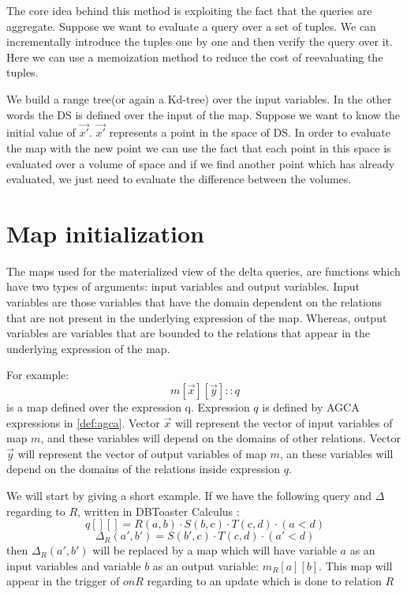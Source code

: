 \documentclass[12pt]{article}
\begin{document}
The core idea behind this method is exploiting the fact that the queries are aggregate. Suppose we want to evaluate a query over a set of tuples. We can incrementally introduce the tuples one by one and then verify the query over it. Here we can use a memoization method to reduce the cost of reevaluating the tuples. \par

We build a range tree(or again a Kd-tree) over the input variables. In the other words the DS is defined over the input of the map.
Suppose we want to know the initial value of $\vec{x'}$. $\vec{x'}$ represents a point in the space of DS. In order to evaluate the map with the new point we can use the fact that each point in this space is evaluated over a volume of space and if we find another point which has already evaluated, we just need to evaluate the difference between the volumes.
\section{Map initialization}

The maps used for the materialized view of the delta queries, are functions which have two types of arguments: input variables and output variables. Input variables are those variables that have the domain dependent on the relations that are not present in the underlying expression of the map. Whereas, output variables are variables that are bounded to the relations that appear in the underlying expression of the map.

For example:
$$m[\vec{x}][\vec{y}]::q$$
is a map defined over the expression q. Expression $q$ is defined by AGCA expressions in \ref{def:agca}. Vector $\vec{x}$ will represent the vector of input variables of map $m$, and these variables will depend on the domains of other relations. Vector $\vec{y}$ will represent the vector of output variables of map $m$, an these variables will depend on the domains of the relations inside expression $q$.

We will start by giving a short example. If we have the following query and $\Delta$ regarding to $R$, written in DBToaster Calculus \cite{1}:
$$q[][]=R(a,b)\cdot S(b,c)\cdot T(c,d)\cdot (a<d)$$
$$\Delta_R(a',b') = S(b',c)\cdot T(c,d)\cdot (a'<d)$$
then $\Delta_R(a',b')$ will be replaced by a map which will have variable $a$ as an input variables and variable $b$ as an output variable: $m_R[a][b]$. This map will appear in the trigger of $onR$ regarding to an update which is done to relation $R$
\end{document}
